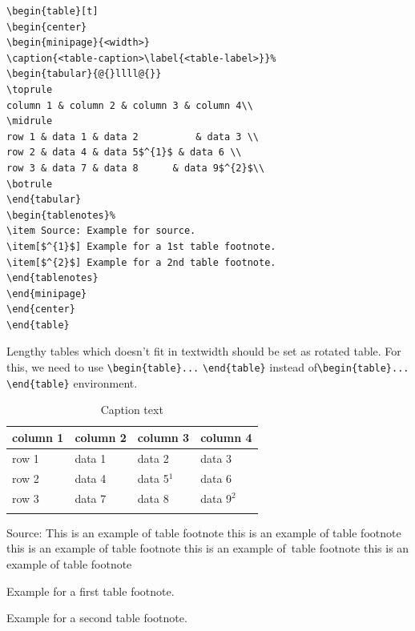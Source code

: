 \documentclass[unnumsec,webpdf,contemporary,large]{oup-authoring-template}%
\theoremstyle{thmstyleone}%
\theoremstyle{thmstyletwo}%
\theoremstyle{thmstylethree}%
\begin{document}
\begin{verbatim}
\begin{table}[t]
\begin{center}
\begin{minipage}{<width>}
\caption{<table-caption>\label{<table-label>}}%
\begin{tabular}{@{}llll@{}}
\toprule
column 1 & column 2 & column 3 & column 4\\
\midrule
row 1 & data 1 & data 2          & data 3 \\
row 2 & data 4 & data 5$^{1}$ & data 6 \\
row 3 & data 7 & data 8      & data 9$^{2}$\\
\botrule
\end{tabular}
\begin{tablenotes}%
\item Source: Example for source.
\item[$^{1}$] Example for a 1st table footnote.
\item[$^{2}$] Example for a 2nd table footnote.
\end{tablenotes}
\end{minipage}
\end{center}
\end{table}
\end{verbatim}


Lengthy tables which doesn't fit in textwidth should be set as rotated table. For this, we need to use \verb+\begin{table}...+ \verb+\end{table}+ instead of\break \verb+\begin{table}...+ \verb+\end{table}+ environment.


\begin{table}[!t]
\caption{Caption text\label{tab1}}%
\begin{tabular*}{\columnwidth}{@{\extracolsep\fill}llll@{\extracolsep\fill}}
\toprule
column 1 & column 2  & column 3 & column 4\\
\midrule
row 1    & data 1   & data 2  & data 3  \\
row 2    & data 4   & data 5$^{1}$  & data 6  \\
row 3    & data 7   & data 8  & data 9$^{2}$  \\
\botrule
\end{tabular*}
\begin{tablenotes}%
\item Source: This is an example of table footnote this is an example of table footnote this is an example of table footnote this is an example of~table footnote this is an example of table footnote
\item[$^{1}$] Example for a first table footnote.
\item[$^{2}$] Example for a second table footnote.
\end{tablenotes}
\end{table}
\end{document}
